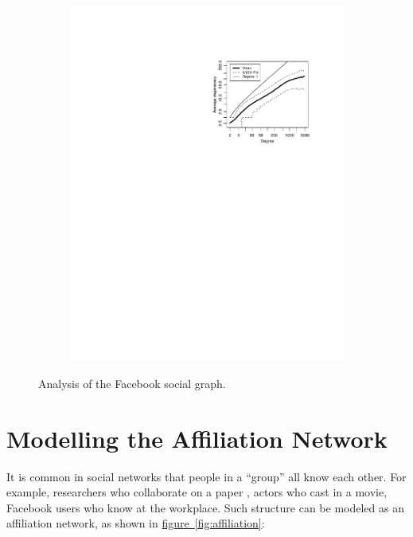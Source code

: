 \documentclass[11pt,a4paper]{article}
\begin{document}
\begin{figure}[htbp]
\begin{subfigure}
	\end{subfigure}
	\begin{subfigure}
		\centering
		\includegraphics[scale=0.95]{fb_degeneracy.pdf}
	\end{subfigure}
	\caption{Analysis of the Facebook social graph.}
	\label{fig:facebook}
\end{figure}

\section{Modelling the Affiliation Network}
\label{sec:affiliation}

It is common in social networks that people in a ``group'' all know each other. For example, researchers who collaborate on a paper \cite{newman2001structure}, actors who cast in a movie, Facebook users who know at the workplace. Such structure can be modeled as an affiliation network, as shown in \hyperref[fig:affiliation]{figure~\ref{fig:affiliation}}:
\end{document}
